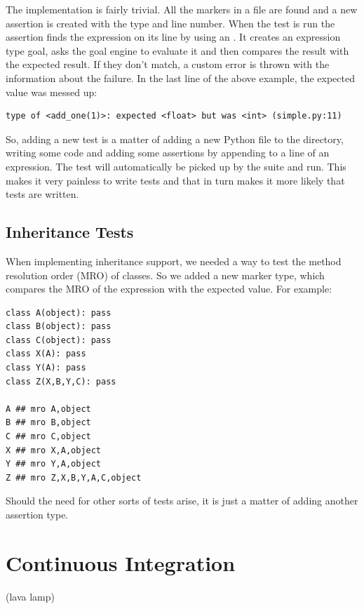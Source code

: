 \documentclass[12pt,halfparskip,DIV11,BCOR10mm]{scrreprt}
\begin{document}
The implementation is fairly trivial. All the markers in a file are found and a new assertion is created with the type and line number. When the test is run the assertion finds the expression on its line by using an . It creates an expression type goal, asks the goal engine to evaluate it and then compares the result with the expected result. If they don't match, a custom error  is thrown with the information about the failure. In the last line of the above example, the expected value was messed up:

\begin{verbatim}
type of <add_one(1)>: expected <float> but was <int> (simple.py:11)
\end{verbatim}

So, adding a new test is a matter of adding a new Python file to the directory, writing some code and adding some assertions by appending  to a line of an expression. The test will automatically be picked up by the suite and run. This makes it very painless to write tests and that in turn makes it more likely that tests are written.

\subsection{Inheritance Tests}

When implementing inheritance support, we needed a way to test the method resolution order (MRO) of classes. So we added a new marker type,  which compares the MRO of the expression with the expected value. For example:

\begin{lstlisting}
class A(object): pass
class B(object): pass
class C(object): pass
class X(A): pass
class Y(A): pass
class Z(X,B,Y,C): pass

A ## mro A,object
B ## mro B,object
C ## mro C,object
X ## mro X,A,object
Y ## mro Y,A,object
Z ## mro Z,X,B,Y,A,C,object
\end{lstlisting}

Should the need for other sorts of tests arise, it is just a matter of adding another assertion type.

\section{Continuous Integration}

  (lava lamp)
\end{document}
